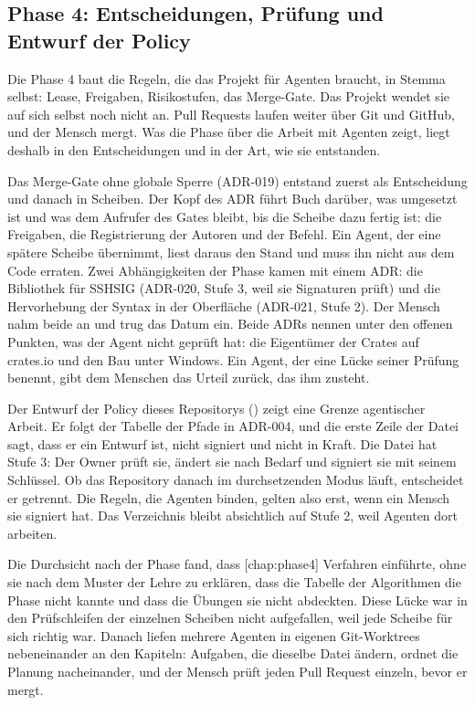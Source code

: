\subsection{Phase 4: Entscheidungen, Prüfung und Entwurf der Policy}

Die Phase 4 baut die Regeln, die das Projekt für Agenten braucht, in Stemma selbst:
Lease, Freigaben, Risikostufen, das Merge-Gate.
Das Projekt wendet sie auf sich selbst noch nicht an.
Pull Requests laufen weiter über Git und GitHub, und der Mensch mergt.
Was die Phase über die Arbeit mit Agenten zeigt, liegt deshalb in den Entscheidungen
und in der Art, wie sie entstanden.

Das Merge-Gate ohne globale Sperre (ADR-019) entstand zuerst als Entscheidung
und danach in Scheiben.
Der Kopf des ADR führt Buch darüber, was umgesetzt ist
und was dem Aufrufer des Gates bleibt, bis die Scheibe dazu fertig ist:
die Freigaben, die Registrierung der Autoren und der Befehl.
Ein Agent, der eine spätere Scheibe übernimmt, liest daraus den Stand
und muss ihn nicht aus dem Code erraten.
Zwei Abhängigkeiten der Phase kamen mit einem ADR: die Bibliothek für SSHSIG (ADR-020, Stufe 3,
weil sie Signaturen prüft) und die Hervorhebung der Syntax in der Oberfläche (ADR-021, Stufe 2).
Der Mensch nahm beide an und trug das Datum ein.
Beide ADRs nennen unter den offenen Punkten, was der Agent nicht geprüft hat:
die Eigentümer der Crates auf crates.io und den Bau unter Windows.
Ein Agent, der eine Lücke seiner Prüfung benennt, gibt dem Menschen das Urteil zurück,
das ihm zusteht.

Der Entwurf der Policy dieses Repositorys () zeigt eine Grenze
agentischer Arbeit.
Er folgt der Tabelle der Pfade in ADR-004,
und die erste Zeile der Datei sagt, dass er ein Entwurf ist, nicht signiert und nicht in Kraft.
Die Datei hat Stufe 3: Der Owner prüft sie, ändert sie nach Bedarf und signiert sie mit seinem
Schlüssel.
Ob das Repository danach im durchsetzenden Modus läuft, entscheidet er getrennt.
Die Regeln, die Agenten binden, gelten also erst, wenn ein Mensch sie signiert hat.
Das Verzeichnis  bleibt absichtlich auf Stufe 2, weil Agenten dort arbeiten.

Die Durchsicht nach der Phase fand, dass [chap:phase4] Verfahren einführte,
ohne sie nach dem Muster der Lehre zu erklären, dass die Tabelle der Algorithmen die Phase nicht
kannte und dass die Übungen sie nicht abdeckten.
Diese Lücke war in den Prüfschleifen der einzelnen Scheiben nicht aufgefallen,
weil jede Scheibe für sich richtig war.
Danach liefen mehrere Agenten in eigenen Git-Worktrees nebeneinander an den Kapiteln:
Aufgaben, die dieselbe Datei ändern, ordnet die Planung nacheinander,
und der Mensch prüft jeden Pull Request einzeln, bevor er mergt.

